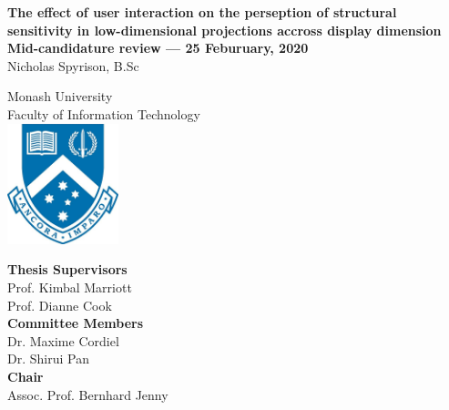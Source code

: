 \documentclass[
  11,
]{article}
\author{}
\date{\vspace{-2.5em}}
\begin{document}

\onehalfspacing
{}

\begin{center}
\huge{\textbf{The effect of user interaction on the perseption of structural 
sensitivity in low-dimensional projections accross display dimension}}\\
\vspace*{1\baselineskip}
\Large{\textbf{Mid-candidature review --- 25 Feburuary, 2020}}\\
\LARGE{Nicholas Spyrison, B.Sc}\\
\vspace*{1\baselineskip}

\LARGE{Monash University}\\
\Large{Faculty of Information Technology}\\
\vspace*{1\baselineskip}
\includegraphics[height = 3.5cm]{./figures/crest.jpg}\\
\vspace*{1\baselineskip}

\Large{\textbf{Thesis Supervisors}}\\
Prof. Kimbal Marriott\\
Prof. Dianne Cook\\
\vspace*{1\baselineskip}
\Large{\textbf{Committee Members}}\\
Dr. Maxime Cordiel\\
Dr. Shirui Pan\\
\vspace*{1\baselineskip}
\Large{\textbf{Chair}}\\
Assoc. Prof. Bernhard Jenny\\
\end{center}

\doublespacing

\newpage
{}
\end{document}
